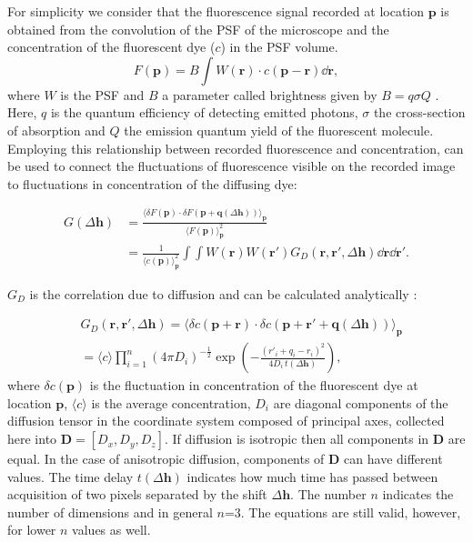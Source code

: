 For simplicity we consider that the fluorescence signal recorded at location $\mathbf{p}$ is obtained from
the convolution of the \ac{PSF} of the microscope and the concentration of the
fluorescent dye ($c$) in the \ac{PSF} volume.
\[F(\mathbf{p}) = B
\int W(\mathbf{r})\cdot c(\mathbf{p}-\mathbf{r})\dd \mathbf{r},\]
where $W$ is the \ac{PSF} and $B$ a parameter called brightness given by $B=q\sigma Q$
\citep{Lakowicz_06_Springer}. Here,
$q$ is the quantum efficiency of detecting emitted photons, $\sigma$ the
cross-section of absorption and $Q$ the emission quantum yield of the
fluorescent molecule. 
Employing this relationship between recorded fluorescence and
concentration, \Eq{~\ref{eq:G_def}} can be used to connect the 
fluctuations of fluorescence visible on the recorded image 
to fluctuations in concentration of the diffusing dye:

\begin{align}
G(\Delta \mathbf{h}) &=\frac{\langle \delta F(\mathbf{p}) \cdot \delta
F(\mathbf{p}+\mathbf{q}(\Delta \mathbf{h}))\rangle_{\mathbf{p}}}{\langle
F(\mathbf{p})\rangle_{\mathbf{p}}^2}\nonumber\\
&=\frac{1}{\langle
c(\mathbf{p})\rangle_{\mathbf{p}}^2}\int\!\!\int
W(\mathbf{r})W(\mathbf{r'})G_D(\mathbf{r},\mathbf{r'},\Delta \mathbf{h})
\dd \mathbf{r}\dd \mathbf{r'}.
\label{eq:G_basic}
\end{align}

$G_D$ is the correlation due to diffusion and can be calculated
analytically \citep{Thompson2002}:

\begin{align}
  &G_D(\mathbf{r},\mathbf{r'},\Delta \mathbf{h}) 
  = \langle\delta c(\mathbf{p}+\mathbf{r})\cdot\delta
  c(\mathbf{p}+\mathbf{r'}+\mathbf{q}(\Delta \mathbf{h}))\rangle_{\mathbf{p}}\nonumber\\
&=\langle c  \rangle
\prod_{i=1}^n(4\pi
D_i)^{-\tfrac{1}{2}}\exp\left(-\frac{(r'_i
+ q_i -r_i)^2
}{4D_i\,t(\Delta \mathbf{h})}\right),
  \label{eq:g_d}
\end{align}
where $\delta c(\mathbf{p})$ is the fluctuation in concentration of the
fluorescent
dye at location $\mathbf{p}$, $\langle c  \rangle$ is the average
concentration, $D_i$ are diagonal components of the diffusion tensor
\cite{deGraaf_00_BiophysJ_78_p1657} in
the coordinate system composed of principal axes,
collected here into $\mathbf{D} =
[D_x, D_y, D_z]$. If diffusion is isotropic then all components in
$\mathbf{D}$ are equal. In the case of anisotropic diffusion, components of
$\mathbf{D}$ can have different values.  The time delay
$t(\Delta \mathbf{h})$ indicates how much time has passed
between acquisition of two pixels separated by the shift $\Delta \mathbf{h}$. 
The number $n$ indicates the number of dimensions and in
general $n$=3. The equations are still valid, however, for lower
$n$ values as well.

